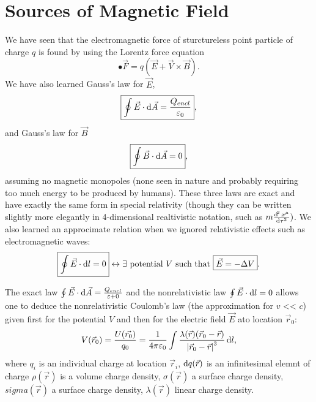 \chapter{Sources of Magnetic Field}

We have seen that the electromagnetic force of sturctureless point particle of charge $q$ is found by using the Lorentz force equation 
\begin{equation}
•\boxed{\vec{F} = q(\vec{E} + \vec{V} \times \vec{B})}.
\end{equation} 
We have also learned Gauss's law for $\vec{E}$,
\begin{equation}
\boxed{\oint \vec{E} \cdot \operatorname{d\!} \vec{A} = \frac{Q_{encl}}{\varepsilon_0}},
\end{equation}
and Gauss's law for $\vec{B}$
\begin{equation}
\boxed{\oint \vec{B} \cdot \operatorname{d\!} \vec{A} = 0},
\end{equation}
assuming no magnetic monopoles (none seen in nature and probably requiring too much energy to be produced by humans). These three laws are exact and have exactly the same form in special relativity (though they can be written slightly more elegantly in 4-dimensional realtivistic notation, such as $m \frac{\operatorname{d\!} ^2 x^\mu}{\operatorname{d\!} \tau^2})$. We also learned an approcimate relation when we ignored relativistic effects such as electromagnetic waves: 
\begin{equation}
\boxed{\oint\vec{E} \cdot \operatorname{d\!} l = 0} \leftrightarrow \exists \text{ potential } V \text{ such that } \boxed{\vec{E} = - \Delta V}.
\end{equation}

The exact law $\oint \vec{E} \cdot \operatorname{d\!} \vec{A} = \frac{Q_{encl}}{\varepsilon+0}$ and the nonrelativistic law $\oint \vec{E} \cdot \operatorname{d\!} l = 0$ allows one to deduce the nonrelativistic Coulomb's law (the approximation for $v$ << $c$) given first for the potential $V$ and then for the electric field $\vec{E}$ ato location $\vec{r}_0$:
\begin{equation}
V(\vec{r}_0) = \frac{U(\vec{r_0})}{q_0} = \frac{1}{4\pi\varepsilon_0} \int \frac{\lambda(\vec{r})(\vec{r}_0 - \vec{r})}{\left| \vec{r}_0 - \vec{r} \right|^3} \operatorname{d\!} l,
\end{equation}
where $q_i$ is an individual charge at location $\vec{r}_i$, $\operatorname{d\!} q (\vec{r})$ is an infinitesimal elemnt of charge $\rho(\vec{r})$ is a volume charge density, $\sigma(\vec{r})$ a surface charge density, $sigma(\vec{r})$ a surface charge density, $\lambda(\vec{r})$ linear charge density.

